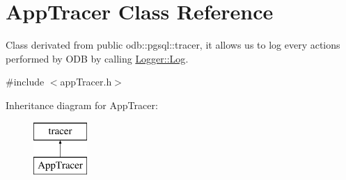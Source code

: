 \hypertarget{class_app_tracer}{}\section{App\+Tracer Class Reference}
\label{class_app_tracer}


Class derivated from public odb\+::pgsql\+::tracer, it allows us to log every actions performed by O\+D\+B by calling \hyperlink{class_logger_aff5ed1580283bcdac191d9ace376b977}{Logger\+::\+Log}.  




{\ttfamily \#include $<$app\+Tracer.\+h$>$}

Inheritance diagram for App\+Tracer\+:\begin{figure}[H]
\begin{center}
\leavevmode
\includegraphics[height=2.000000cm]{d6/df2/class_app_tracer}
\end{center}
\end{figure}
